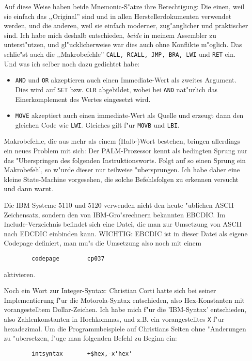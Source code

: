 \documentclass[12pt,a4paper,twoside]{report}
\begin{document}
Auf diese Weise haben beide Mnemonic-S"atze ihre Berechtigung: Die
einen, weil sie einfach das ,,Original'' sind und in allen
Herstellerdokumenten verwendet werden, und die anderen, weil sie
einfach moderner, zug"anglicher und praktischer sind.  Ich habe mich
deshalb entschieden, {\em beide} in meinem Assembler zu unterst"utzen,
und gl"ucklicherweise war dies auch ohne Konflikte m"oglich.  Das
schlie"st auch die ,,Makrobefehle'' {\tt CALL, RCALL, JMP, BRA, LWI}
und {\tt RET} ein.  Und was ich selber noch dazu gedichtet habe:
\begin{itemize}
\item{{\tt AND} und {\tt OR} akzeptieren auch einen Immediate-Wert als zweites
      Argument.  Dies wird auf {\tt SET} bzw. {\tt CLR} abgebildet, wobei bei
      {\tt AND} nat"urlich das Einerkomplement des Wertes eingesetzt wird.}
\item{{\tt MOVE} akzeptiert auch einen immediate-Wert als Quelle und erzeugt
      dann den gleichen Code wie {\tt LWI}.  Gleiches gilt f"ur {\tt MOVB} und
      {\tt LBI}.}
\end{itemize}
Makrobefehle, die aus mehr als einem (Halb-)Wort bestehen, bringen
allerdings ein neues Problem mit sich: Der PALM-Prozessor kennt als
bedingten Sprung nur das "Uberspringen des folgenden Instruktionsworts. 
Folgt auf so einen Sprung ein Makrobefehl, so w"urde dieser nur
teilweise "ubersprungen.  Ich habe daher eine kleine State-Machine
vorgesehen, die solche Befehlsfolgen zu erkennen versucht und dann
warnt.

Die IBM-Systeme 5110 und 5120 verwenden nicht den heute "ublichen
ASCII-Zeichensatz, sondern den von IBM-Gro"srechnern bekannten
EBCDIC.  Im Include-Verzeichnis befindet sich eine Datei, die man
zur Umsetzung von ASCII nach EDCDIC einbinden kann.  WICHTIG:
EBCDIC ist in dieser Datei als eigene Codepage definiert, man
mu"s die Umsetzung also noch mit einem
\begin{verbatim}
        codepage        cp037
\end{verbatim}
aktivieren.

Noch ein Wort zur Integer-Syntax: Christian Corti hatte sich bei seiner
Implementierung f"ur die Motorola-Syntax entschieden, also
Hex-Konstanten mit vorangestelltem Dollar-Zeichen.  Ich habe mich f"ur
die 'IBM-Syntax' entschieden, also Zahlenkonstanten in Hochkommas, und z.B. 
ein vorangestelltes {\tt X} f"ur hexadezimal.  Um die Programmbeispiele
auf Christians Seiten ohne "Anderungen zu "ubersetzen, f"uge man
folgenden Befehl zu Beginn ein:
\begin{verbatim}
        intsyntax       +$hex,-x'hex'
\end{verbatim}
\end{document}
